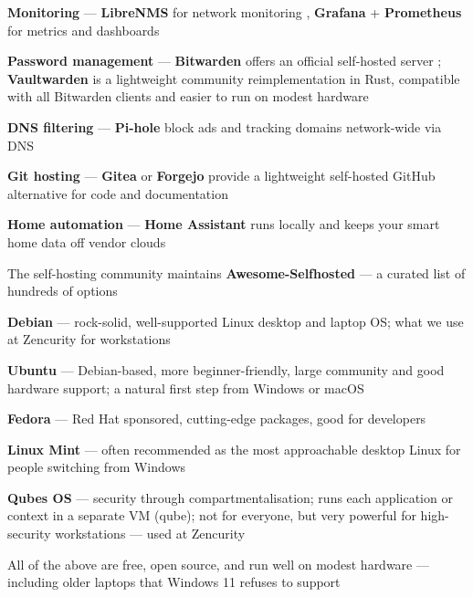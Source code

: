\documentclass[Screen16to9,17pt]{foils}
\begin{document}


\begin{list2}
\item {\bf Monitoring} — {\bf LibreNMS} for network monitoring ,
{\bf Grafana} + {\bf Prometheus} for metrics and dashboards 
\item {\bf Password management} — {\bf Bitwarden} offers an official self-hosted server
; {\bf Vaultwarden} is a lightweight community reimplementation
in Rust, compatible with all Bitwarden clients and easier to run on modest hardware
\item {\bf DNS filtering} — {\bf Pi-hole} block ads and
tracking domains network-wide via DNS 
\item {\bf Git hosting} — {\bf Gitea} or {\bf Forgejo} provide a lightweight self-hosted
GitHub alternative for code and documentation 
\item {\bf Home automation} — {\bf Home Assistant} runs locally and keeps your smart
home data off vendor clouds 
\item The self-hosting community maintains {\bf Awesome-Selfhosted} —
a curated list of hundreds of options 
\end{list2}



\begin{list2}
\item {\bf Debian} — rock-solid, well-supported Linux desktop and laptop OS;
what we use at Zencurity for workstations 
\item {\bf Ubuntu} — Debian-based, more beginner-friendly, large community and
good hardware support; a natural first step from Windows or macOS 
\item {\bf Fedora} — Red Hat sponsored, cutting-edge packages, good for developers 
\item {\bf Linux Mint} — often recommended as the most approachable desktop Linux
for people switching from Windows 
\item {\bf Qubes OS} — security through compartmentalisation; runs each application
or context in a separate VM (qube); not for everyone, but very powerful for
high-security workstations — used at Zencurity 
\item All of the above are free, open source, and run well on modest hardware —
including older laptops that Windows 11 refuses to support
\end{list2}
\end{document}
